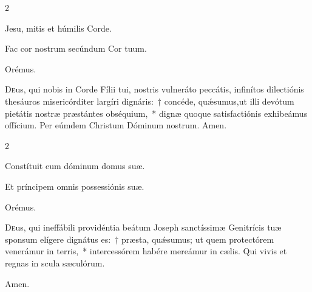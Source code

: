 \documentclass[benediction_assumption_la_en.tex]{subfiles}
\begin{document}


\begin{multicols}{2}
\end{multicols}


\vv Jesu, mitis et húmilis Corde.

\rr Fac cor nostrum secúndum Cor tuum.

Orémus.

\lettrine{D}{e}us, qui nobis in Corde Fílii tui, nostris vulneráto peccátis, infinítos dile\-ctiónis thesáuros misericórditer largíri dignáris:~† concéde, quǽsumus,ut illi devótum pietátis nostræ præstántes obséquium,~* dignæ quoque satisfa\-ctiónis exhibeámus offícium. Per eúmdem Christum Dóminum nostrum. \rr Amen.





\begin{multicols}{2}
{}
\end{multicols}


\vv Constítuit eum dóminum domus suæ.

\rr Et príncipem omnis possessiónis suæ.

Orémus.
   
\lettrine{D}{e}us, qui ineffábili providéntia beátum Joseph sanctíssimæ Genitrícis tuæ sponsum elígere dignátus es:~† præsta, quǽsumus; ut quem prote\-ctórem venerámur in terris,~* intercessórem habére mereámur in cælis. Qui vivis et regnas in scula sæculórum.

\rr Amen.
\end{document}
